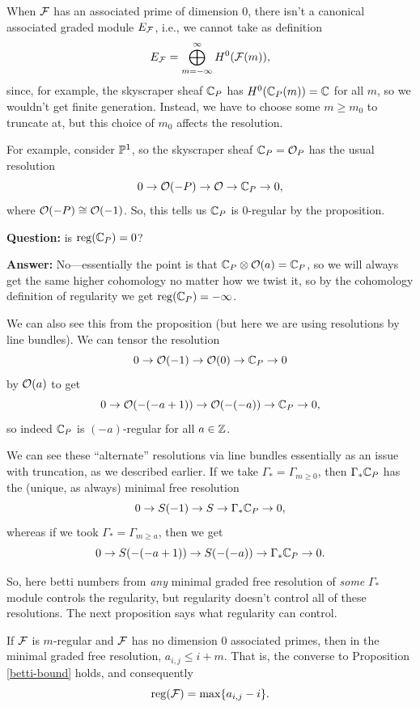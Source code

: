 \documentclass[12pt]{article}
\newcommand{\reg}{\mathrm{reg}}
\begin{document}
\begin{eg}
    When $\cF$ has an associated prime of dimension 0, there isn't a canonical associated graded module $E_\cF$, i.e., we cannot take as definition
    \[E_\cF = \bigoplus_{m=-\infty}^\infty H^0(\cF(m)),\]
    since, for example, the skyscraper sheaf $\C_P$ has $H^0(\C_P(m))=\C$ for all $m$, so we wouldn't get finite generation. Instead, we have to choose some $m\geq m_0$ to truncate at, but this choice of $m_0$ affects the resolution.
    
    For example, consider $\P^1$, so the skyscraper sheaf $\C_P = \cO_P$ has the usual resolution
    \[0 \to \cO(-P) \to \cO \to \C_P \to 0,\]
    where $\cO(-P)\cong \cO(-1)$. So, this tells us $\C_P$ is $0$-regular by the proposition.

    \textbf{Question:} is $\reg(\C_P)=0$?
    
    \textbf{Answer:} No---essentially the point is that $\C_P\otimes \cO(a) = \C_P$, so we will always get the same higher cohomology no matter how we twist it, so by the cohomology definition of regularity we get $\reg(\C_P) = -\infty$.

    We can also see this from the proposition (but here we are using resolutions by line bundles). We can tensor the resolution
    \[0\to \cO(-1) \to \cO(0) \to \C_P \to 0\]
    by $\cO(a)$ to get
    \[0 \to \cO(-(-a+1)) \to \cO(-(-a)) \to \C_P \to 0,\]
    so indeed $\C_P$ is $(-a)$-regular for all $a\in \Z$.

    We can see these ``alternate'' resolutions via line bundles essentially as an issue with truncation, as we described earlier. If we take $\Gamma_* = \Gamma_{m\geq 0}$, then $\Gamma_* \C_P$ has the (unique, as always) minimal free resolution
    \[0 \to S(-1) \to S \to \Gamma_* \C_P \to 0,\]
    whereas if we took $\Gamma_* = \Gamma_{m\geq a}$, then we get
    \[0 \to S(-(-a+1)) \to S(-(-a)) \to \Gamma_* \C_P \to 0.\]
    
    So, here betti numbers from \textit{any} minimal graded free resolution of \textit{some} $\Gamma_*$ module controls the regularity, but regularity doesn't control all of these resolutions. The next proposition says what regularity can control.
\end{eg}

\begin{prop}
    If $\cF$ is $m$-regular and $\cF$ has no dimension 0 associated primes, then in the minimal graded free resolution, $a_{i,j}\leq i+m$. That is, the converse to Proposition \ref{betti-bound} holds, and consequently
    \[\reg(\cF) = \max\{a_{i,j}-i\}.\]
\end{prop}
\end{document}
